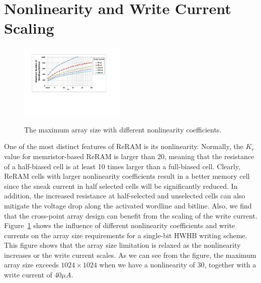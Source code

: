 \section{Nonlinearity and Write Current Scaling}\label{sec:scale}
\begin{figure}[!b]
\centering
  \includegraphics[width=0.45\textwidth]{./figures/non_linear_f}\\
  \vspace{-5pt}
  \caption{The maximum array size with different nonlinearity coefficients.}\label{fig:non_linear}
\end{figure}
One of the most distinct features of ReRAM is its nonlinearity. Normally,
the $K_r$ value for memristor-based ReRAM is larger than 20, meaning that
the resistance of a half-biased cell is at least 10 times larger than a
full-biased cell. Clearly, ReRAM cells with larger nonlinearity
coefficients result in a better memory cell since the sneak current in
half selected cells will be significantly reduced. In addition, the
increased resistance at half-selected and unselected cells can also
mitigate the voltage drop along the activated wordline and bitline. Also,
we find that the cross-point array design can benefit from the scaling of
the write current. Figure~\ref{fig:non_linear} shows the influence of
different nonlinearity coefficients and write currents on the array size
requirements for a single-bit HWHB writing scheme. This figure shows that
the array size limitation is relaxed as the nonlinearity increases or the
write current scales. As we can see from the figure, the maximum array
size exceeds $1024\times 1024$ when we have a nonlinearity of $30$,
together with a write current of $40\mu A$.

